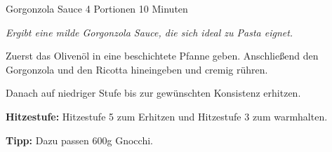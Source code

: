 \begin{recipe}{Gorgonzola Sauce} {4 Portionen} {10 Minuten}

  \freeform
  \textit{Ergibt eine milde Gorgonzola Sauce, die sich ideal zu Pasta eignet.}
  
  
  Zuerst das Olivenöl in eine beschichtete Pfanne geben.
  Anschließend den Gorgonzola und den Ricotta hineingeben und cremig rühren.

  \newstep
  Danach auf niedriger Stufe bis zur gewünschten Konsistenz erhitzen.
  
  \freeform
  \hrulefill
  
  \freeform
  \textbf{Hitzestufe:}
  Hitzestufe 5 zum Erhitzen und Hitzestufe 3 zum warmhalten.

  \freeform
  \textbf{Tipp:}
  Dazu passen 600g Gnocchi.
  
  \end{recipe}
  